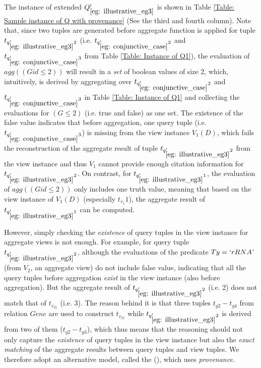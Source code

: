\begin{example}
The instance of extended $Q_{\ref{eg: illustrative_eg3}}'$ is shown in Table \ref{Table: Sample instance of Q with provenance} (See the third and fourth column). Note that, since two tuples are generated before aggregate function is applied for tuple $t_{q_{\ref{eg: illustrative_eg3}}'2}$ (i.e. $t_{q_{\ref{eg: conjunctive_case}}'2}$ and $t_{q_{\ref{eg: conjunctive_case}}'3}$ from Table \ref{Table: Instance of Q1}), the evaluation of $agg((Gid\leq2))$ will result in a {\em set} of boolean values of size 2, which, intuitively, is derived by aggregating over $t_{q_{\ref{eg: conjunctive_case}}'2}$ and $t_{q_{\ref{eg: conjunctive_case}}'3}$ in Table \ref{Table: Instance of Q1} and collecting the evaluations for $(G\leq 2)$ (i.e. true and false) as one set. The existence of the false value indicates that before aggregation, one query tuple (i.e. $t_{q_{\ref{eg: conjunctive_case}}'3}$) is missing from the view instance $V_1(D)$, which fails the reconstruction of the aggregate result of tuple $t_{q_{\ref{eg: illustrative_eg3}}'2}$ from the view instance and thus $V_1$ cannot provide enough citation information for $t_{q_{\ref{eg: illustrative_eg3}}'2}$. On contrast, for $t_{q_{\ref{eg: illustrative_eg3}}'1}$, the evaluation of $agg((Gid\leq2))$ only includes one truth value, meaning that based on the view instance of $V_1(D)$ (especially $t_{v_1}1$), the aggregate result of $t_{q_{\ref{eg: illustrative_eg3}}'1}$ can be computed.


However, simply checking the {\em existence} of query tuples in the view instance for aggregate views is not enough. For example, for query tuple $t_{q_{\ref{eg: illustrative_eg3}}'2}$, although the evaluations of the predicate $Ty=`rRNA$' (from $V_2$, an aggregate view) do not include false value, indicating that all the query tuples before aggregation {\em exist} in the view instance (also before aggregation). But the aggregate result of $t_{q_{\ref{eg: illustrative_eg3}}'2}$ (i.e. 2) does not match that of $t_{v_21}$ (i.e. 3). The reason behind it is that three tuples $t_{g2}-t_{g4}$ from relation $Gene$ are used to construct $t_{v_21}$ while $t_{q_{\ref{eg: illustrative_eg3}}'2}$ is derived from two of them ($t_{g2}-t_{g3}$), which thus means that the reasoning should not only capture the {\em existence} of query tuples in the view instance but also the {\em exact matching} of the aggregate results between query tuples and view tuples.
We therefore adopt an alternative model, called the {\em \pbafull} ({\em \pba}), which uses {\em provenance}.


\end{example}
